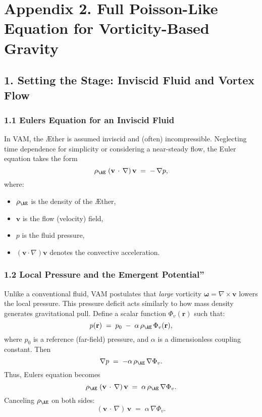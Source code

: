 
\section*{Appendix 2. Full Poisson-Like Equation for Vorticity-Based Gravity}

\subsection*{1. Setting the Stage: Inviscid Fluid and Vortex Flow}

\subsubsection*{1.1 Euler\rqs s Equation for an Inviscid Fluid}
In VAM, the Æther is assumed inviscid and (often) incompressible. Neglecting time dependence for simplicity or considering a near-steady flow, the Euler equation takes the form
\[
    \rho_{\mathrm{\AE}}\;(\mathbf{v}\,\cdot\,\nabla)\,\mathbf{v}
    \;=\;
    -\,\nabla p,
\]
where:
\begin{itemize}
    \item \(\rho_{\mathrm{\AE}}\) is the density of the Æther,
    \item \(\mathbf{v}\) is the flow (velocity) field,
    \item \(p\) is the fluid pressure,
    \item \((\mathbf{v}\cdot\nabla)\mathbf{v}\) denotes the convective acceleration.
\end{itemize}

\subsubsection*{1.2 Local Pressure and the Emergent \grqq Potential\textquotedblright}
Unlike a conventional fluid, VAM postulates that \textit{large} vorticity \(\boldsymbol{\omega} = \nabla \times \mathbf{v}\) lowers the local pressure. This pressure deficit acts similarly to how mass density generates gravitational pull. Define a scalar function \(\Phi_v(\mathbf{r})\) such that:
\[
    p(\mathbf{r})
    \;=\;
    p_0 \;-\; \alpha \,\rho_{\mathrm{\AE}}\,\Phi_v(\mathbf{r}),
\]
where \(p_0\) is a reference (far-field) pressure, and \(\alpha\) is a dimensionless coupling constant. Then
\[
    \nabla p
    \;=\;
    -\alpha \,\rho_{\mathrm{\AE}} \,\nabla \Phi_v.
\]
Thus, Euler\rqs s equation becomes
\[
    \rho_{\mathrm{\AE}}\;(\mathbf{v}\,\cdot\,\nabla)\,\mathbf{v}
    \;=\;
    \alpha\,\rho_{\mathrm{\AE}}\,\nabla \Phi_v.
\]
Canceling \(\rho_{\mathrm{\AE}}\) on both sides:
\[
    (\mathbf{v}\,\cdot\,\nabla)\,\mathbf{v}
    \;=\;
    \alpha\,\nabla \Phi_v.
    \tag{1}
\]

